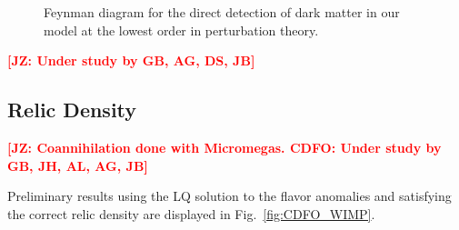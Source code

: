 \documentclass[11pt]{cernrep}
\def\JZ#1{{\bf  \textcolor{red}{[JZ: {#1}]}}}
\begin{document}
\begin{figure}[!t]
\center
{}
\caption{Feynman diagram for the direct detection of dark matter in our model at the lowest order in perturbation theory.}
\label{fig:dd_1loop}
\end{figure}


\JZ{Under study by GB, AG, DS, JB}

\subsection{Relic Density}

\JZ{Coannihilation done with Micromegas. CDFO: Under study by GB, JH, AL, AG, JB}

Preliminary results using the LQ solution to the flavor anomalies and satisfying the correct relic density are displayed in Fig.~\ref{fig:CDFO_WIMP}.
\end{document}
